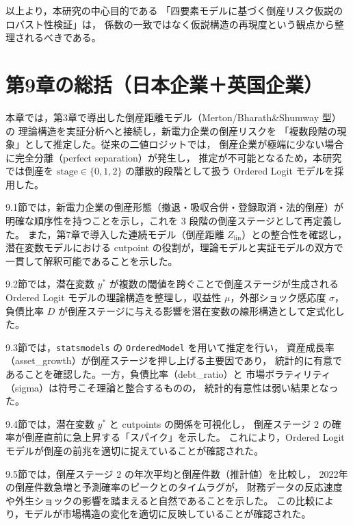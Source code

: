 以上より，本研究の中心目的である
「四要素モデルに基づく倒産リスク仮説のロバスト性検証」は，
係数の一致ではなく仮説構造の再現度という観点から整理されるべきである。



\section{第9章の総括（日本企業＋英国企業）}

本章では，第3章で導出した倒産距離モデル（Merton/Bharath\&Shumway 型）の
理論構造を実証分析へと接続し，新電力企業の倒産リスクを
「複数段階の現象」として推定した。従来の二値ロジットでは，
倒産企業が極端に少ない場合に完全分離（perfect separation）が発生し，
推定が不可能となるため，本研究では倒産を
\(\text{stage}\in\{0,1,2\}\) の離散的段階として扱う Ordered Logit モデルを採用した。

9.1節では，新電力企業の倒産形態（撤退・吸収合併・登録取消・法的倒産）が
明確な順序性を持つことを示し，これを 3 段階の倒産ステージとして再定義した。
また，第7章で導入した連続モデル（倒産距離 \(Z_{\text{lin}}\)）との整合性を確認し，
潜在変数モデルにおける cutpoint の役割が，理論モデルと実証モデルの双方で
一貫して解釈可能であることを示した。

9.2節では，潜在変数 \(y^*\) が複数の閾値を跨ぐことで倒産ステージが生成される
Ordered Logit モデルの理論構造を整理し，収益性 \(\mu\)，外部ショック感応度 \(\sigma\)，
負債比率 \(D\) が倒産ステージに与える影響を潜在変数の線形構造として定式化した。

9.3節では，\texttt{statsmodels} の \texttt{OrderedModel} を用いて推定を行い，
資産成長率（asset\_growth）が倒産ステージを押し上げる主要因であり，
統計的に有意であることを確認した。一方，負債比率（debt\_ratio）と
市場ボラティリティ（sigma）は符号こそ理論と整合するものの，
統計的有意性は弱い結果となった。

9.4節では，潜在変数 \(y^*\) と cutpoints の関係を可視化し，
倒産ステージ 2 の確率が倒産直前に急上昇する「スパイク」を示した。
これにより，Ordered Logit モデルが倒産の前兆を適切に捉えていることが確認された。

9.5節では，倒産ステージ 2 の年次平均と倒産件数（推計値）を比較し，
2022年の倒産件数急増と予測確率のピークとのタイムラグが，
財務データの反応速度や外生ショックの影響を踏まえると自然であることを示した。
この比較により，モデルが市場構造の変化を適切に反映していることが確認された。

